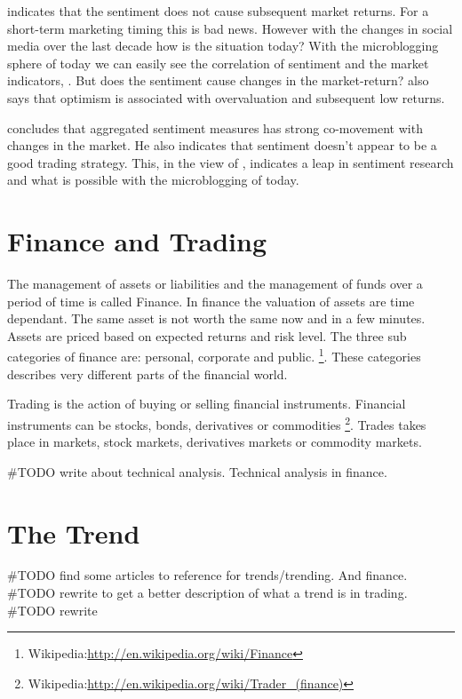 \cite[p3]{Brown20041} indicates that the sentiment does not cause subsequent
market returns. For a short-term marketing timing this is bad news. However
with the changes in social media over the last decade how is the situation
today? With the microblogging sphere of today we can easily see the
correlation of sentiment and the market indicators,
\cite[]{annikajubbega11:twitter_driver_stock_price}. But
does the sentiment cause changes in the market-return?
\cite[p3]{Brown20041} also says that optimism is associated with overvaluation
and subsequent low returns.

\cite[p]{Brown20041} concludes that aggregated sentiment measures has strong
co-movement with changes in the market. He also indicates that sentiment
doesn't appear to be a good trading strategy. This, in the view of
\cite[]{Zhang201155}, indicates a leap in sentiment research and what is possible
with the microblogging of today.

\section{Finance and Trading}


The management of assets or liabilities and the management of funds over a
period of time is called Finance. In finance the valuation of assets are time
dependant. The same asset is not worth the same now and in a few minutes. Assets are
priced based on expected returns and risk level. The three sub categories of
finance are: personal, corporate and public. 
\footnote{Wikipedia:\url{http://en.wikipedia.org/wiki/Finance}}.
These categories describes very different parts of the financial world. 

Trading is the action of buying or selling financial instruments.
Financial instruments can be stocks, bonds, derivatives or commodities 
\footnote{Wikipedia:\url{http://en.wikipedia.org/wiki/Trader_(finance)}}.
Trades takes place in markets,  stock markets, derivatives markets or commodity
markets.

#TODO write about technical analysis. 
Technical analysis in finance. 


\section{The Trend}
#TODO find some articles to reference for trends/trending. And finance.   
#TODO rewrite to get a better description of what a trend is in trading.
#TODO rewrite

